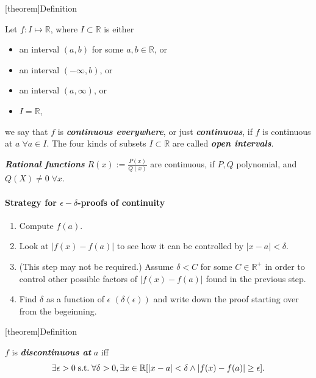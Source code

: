 \documentclass[12pt]{report}
\theoremstyle{definition}
\begin{document}
[theorem]{Definition}
\begin{continuous function}
    Let $f:I\mapsto\mathbb{R}$, where $I\subset\mathbb{R}$ is either
    \begin{itemize}
        \item an interval $(a,b)$ for some $a,b\in\mathbb{R}$, or
        \item an interval $(-\infty, b)$, or
        \item an interval $(a, \infty)$, or
        \item $I = \mathbb{R}$,
    \end{itemize}
    we say that $f$ is \textbf{\emph{continuous everywhere}}, or just \textbf{\emph{continuous}},
    if $f$ is continuous at $a \;\forall a\in I$.
    The four kinds of subsets $I\subset\mathbb{R}$ are called \textbf{\emph{open intervals}}.
\end{continuous function}

\begin{ex}
    \textbf{\emph{Rational functions}} $R(x):=\frac{P(x)}{Q(x)}$ are continuous,
    if $P, Q$ polynomial, and $Q(X) \neq 0 \;\forall x$.
\end{ex}


\paragraph{Strategy for $\epsilon-\delta$-proofs of continuity}
\begin{enumerate}
    \item Compute $f(a)$.
    \item Look at $|f(x)-f(a)|$ to see how it can be controlled by $|x-a|<\delta$.
    \item (This step may not be required.) Assume $\delta<C$ for some $C\in\mathbb{R}^{+}$
        in order to control other possible factors of $|f(x) - f(a)|$ found in the previous step.
    \item Find $\delta$ as a function of $\epsilon$ $(\delta(\epsilon))$ and write down
        the proof starting over from the begeinning.
\end{enumerate}

[theorem]{Definition}
\begin{discontinuous at a}
    $f$ is \textbf{\emph{discontinuous at}} $a$ iff\[
        \exists \epsilon>0 \;\textnormal{s.t.}\; \forall\delta>0,
        \exists x\in\mathbb{R} [|x-a|<\delta \wedge|f(x)-f(a)|\ge\epsilon].
    \]
\end{discontinuous at a}
\end{document}
